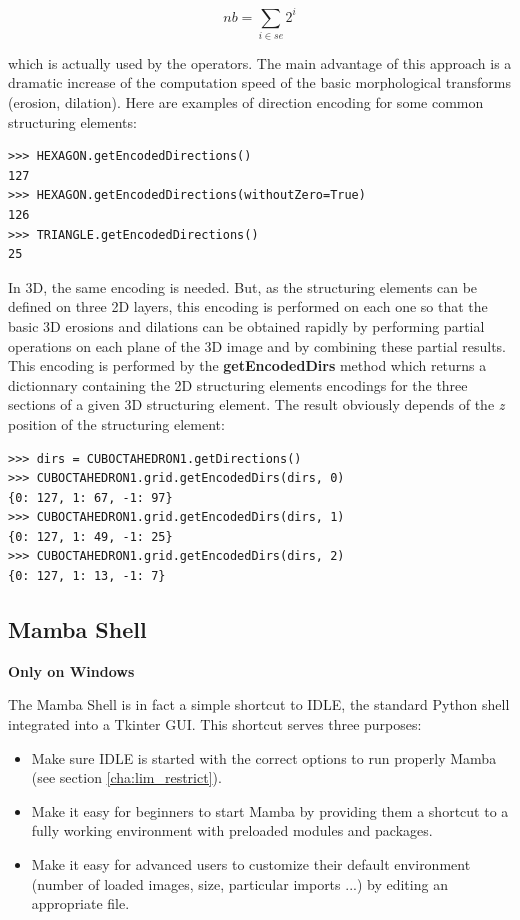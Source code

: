 \documentclass[a4paper,10pt,oneside]{article}
\begin{document}
\begin{displaymath}
nb = \sum_{i \in se} 2^i
\end{displaymath}

which is actually used by the operators. The main advantage of this approach is a dramatic increase of the computation speed of the basic
morphological transforms (erosion, dilation). Here are examples of direction encoding for some common structuring elements:

\lstset{language=Python}
\begin{lstlisting}
>>> HEXAGON.getEncodedDirections()
127
>>> HEXAGON.getEncodedDirections(withoutZero=True)
126
>>> TRIANGLE.getEncodedDirections()
25
\end{lstlisting}

In 3D, the same encoding is needed. But, as the structuring elements can be defined on three 2D layers, this encoding is performed on each
one so that the basic 3D erosions and dilations can be obtained rapidly by performing partial operations on each plane of the 3D image and by
combining these partial results. This encoding is performed by the \textbf{getEncodedDirs} method which returns a dictionnary containing the 2D
structuring elements encodings for the three sections of a given 3D structuring element. The result obviously depends of the \emph{z} position of the
structuring element:

\lstset{language=Python}
\begin{lstlisting}
>>> dirs = CUBOCTAHEDRON1.getDirections()
>>> CUBOCTAHEDRON1.grid.getEncodedDirs(dirs, 0)
{0: 127, 1: 67, -1: 97}
>>> CUBOCTAHEDRON1.grid.getEncodedDirs(dirs, 1)
{0: 127, 1: 49, -1: 25}
>>> CUBOCTAHEDRON1.grid.getEncodedDirs(dirs, 2)
{0: 127, 1: 13, -1: 7}
\end{lstlisting}

\subsection{Mamba Shell}
\label{cha:mamba_shell}

\textbf{Only on Windows}

The Mamba Shell is in fact a simple shortcut to IDLE, the standard Python shell
integrated into a Tkinter GUI. This shortcut serves three purposes:

\begin{itemize}
\item Make sure IDLE is started with the correct options to run properly Mamba
(see section \ref{cha:lim_restrict}).
\item Make it easy for beginners to start Mamba by providing them a shortcut
to a fully working environment with preloaded modules and packages.
\item Make it easy for advanced users to customize their default environment
(number of loaded images, size, particular imports ...) by editing an appropriate
file.
\end{itemize}
\end{document}
